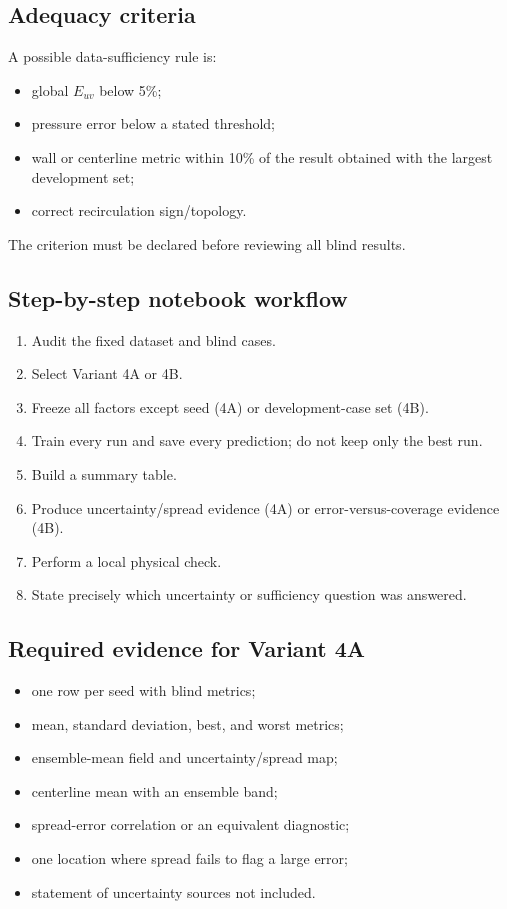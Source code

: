 \documentclass[11pt]{article}
\begin{document}
\subsection{Adequacy criteria}
A possible data-sufficiency rule is:
\begin{itemize}
\item global $E_{uv}$ below 5\%;
\item pressure error below a stated threshold;
\item wall or centerline metric within 10\% of the result obtained with the largest development set;
\item correct recirculation sign/topology.
\end{itemize}
The criterion must be declared before reviewing all blind results.

\subsection{Step-by-step notebook workflow}
\begin{enumerate}
\item Audit the fixed dataset and blind cases.
\item Select Variant 4A or 4B.
\item Freeze all factors except seed (4A) or development-case set (4B).
\item Train every run and save every prediction; do not keep only the best run.
\item Build a summary table.
\item Produce uncertainty/spread evidence (4A) or error-versus-coverage evidence (4B).
\item Perform a local physical check.
\item State precisely which uncertainty or sufficiency question was answered.
\end{enumerate}

\subsection{Required evidence for Variant 4A}
\begin{itemize}
\item one row per seed with blind metrics;
\item mean, standard deviation, best, and worst metrics;
\item ensemble-mean field and uncertainty/spread map;
\item centerline mean with an ensemble band;
\item spread-error correlation or an equivalent diagnostic;
\item one location where spread fails to flag a large error;
\item statement of uncertainty sources not included.
\end{itemize}
\end{document}
